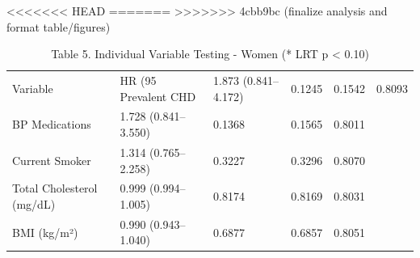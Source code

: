 <<<<<<< HEAD
=======
>>>>>>> 4cbb9bc (finalize analysis and format table/figures)
\begin{table}[ht]
\centering
\caption{Table 5. Individual Variable Testing - Women (* LRT p < 0.10)} 
\begin{tabular}{llllll}
  \toprule
Variable & HR (95%
  \midrule
Prevalent CHD & 1.873 (0.841–4.172) & 0.1245 & 0.1542 & 0.8093 &  \\ 
  BP Medications & 1.728 (0.841–3.550) & 0.1368 & 0.1565 & 0.8011 &  \\ 
  Current Smoker & 1.314 (0.765–2.258) & 0.3227 & 0.3296 & 0.8070 &  \\ 
  Total Cholesterol (mg/dL) & 0.999 (0.994–1.005) & 0.8174 & 0.8169 & 0.8031 &  \\ 
  BMI (kg/m²) & 0.990 (0.943–1.040) & 0.6877 & 0.6857 & 0.8051 &  \\ 
   \bottomrule
\end{tabular}
\end{table}
